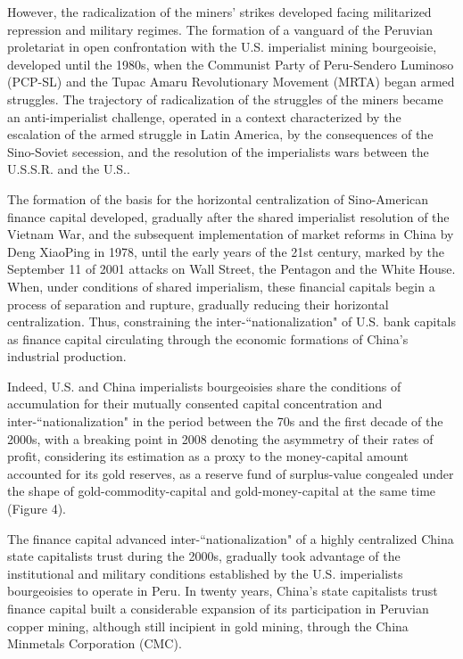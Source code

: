 \documentclass[]{interact}
\theoremstyle{plain}%
\theoremstyle{definition}
\theoremstyle{remark}
\begin{document}
However, the radicalization of the miners' strikes developed facing militarized repression and military regimes. The formation of a vanguard of the Peruvian proletariat in open confrontation with the U.S. imperialist mining bourgeoisie, developed until the 1980s, when the Communist Party of Peru-Sendero Luminoso (PCP-SL) and the Tupac Amaru Revolutionary Movement (MRTA) began armed struggles. The trajectory of radicalization of the struggles of the miners became an anti-imperialist challenge, operated in a context characterized by the escalation of the armed struggle in Latin America, by the consequences of the Sino-Soviet secession, and the resolution of the imperialists wars between the U.S.S.R. and the U.S..

The formation of the basis for the horizontal centralization of Sino-American finance capital developed, gradually after the shared imperialist resolution of the Vietnam War, and the subsequent implementation of market reforms in China by Deng XiaoPing in 1978, until the early years of the 21st century, marked by the September 11 of 2001 attacks on Wall Street, the Pentagon and the White House. When, under conditions of shared imperialism, these financial capitals begin a process of separation and rupture, gradually reducing their horizontal centralization. Thus, constraining the inter-“nationalization" of U.S. bank capitals as finance capital circulating through the economic formations of China's industrial production.

Indeed, U.S. and China imperialists bourgeoisies share the conditions of accumulation for their mutually consented capital concentration and inter-“nationalization" in the period between the 70s and the first decade of the 2000s, with a breaking point in 2008 denoting the asymmetry of their rates of profit, considering its estimation as a proxy to the money-capital amount accounted for its gold reserves, as a reserve fund of surplus-value congealed under the shape of gold-commodity-capital and gold-money-capital at the same time (Figure 4).

The finance capital advanced inter-“nationalization" of a highly centralized China state capitalists trust during the 2000s, gradually took advantage of the institutional and military conditions established by the U.S. imperialists bourgeoisies to operate in Peru. In twenty years, China's state capitalists trust finance capital built a considerable expansion of its participation in Peruvian copper mining, although still incipient in gold mining, through the China Minmetals Corporation (CMC).
\end{document}
